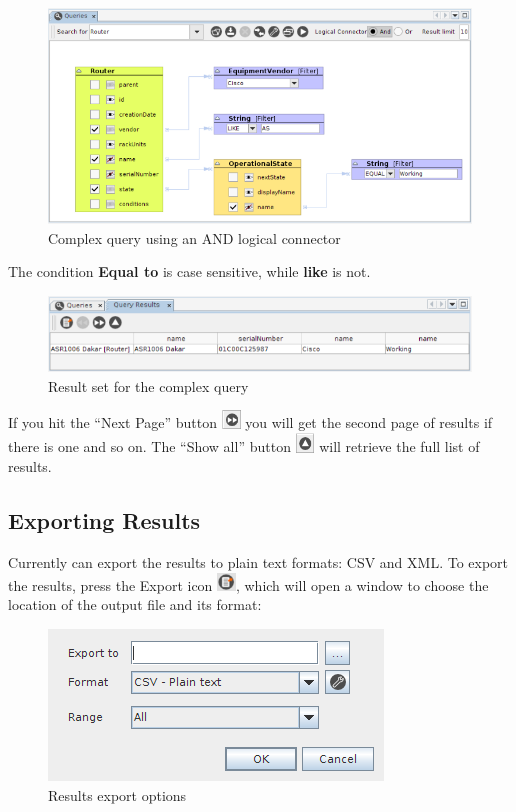 \documentclass[a4paper]{article}
\begin{document}
	\begin{figure}[h!]
		\centering
		\includegraphics[width=1.1\linewidth]{img/query_example_2.png}
		\caption{Complex query using an AND logical connector}
		\label{fig:query_example_2}
	\end{figure}
	
	The condition \textbf{Equal to} is case sensitive, while \textbf{like} is not.
	\begin{figure}[h!]
		\centering
		\includegraphics[width=1.1\linewidth]{img/query_example_2_results.png}
		\caption{Result set for the complex query}
		\label{fig:query_example_2_results}
	\end{figure}
	If you hit the “Next Page” button \includegraphics[width=0.5cm]{img/icon_next_page.png} you will get the second page of results if there is one and so on. The “Show all” button \includegraphics[width=0.5cm]{img/icon_retrieve_all.png} will retrieve the full list of results.
	\newpage
	\subsection{Exporting Results}
	Currently can export the results to plain text formats: CSV and XML. To export the results, press the Export icon \includegraphics[width=0.5cm]{img/icon_export.png}, which will open a window to choose the location of the output file and its format:
	\begin{figure}[h!]
		\centering
		\includegraphics[width=0.5\linewidth]{img/query_result_exportmenu.png}
		\caption{Results export options}
		\label{fig:query_result_exportmenu}
	\end{figure}
	
\end{document}
